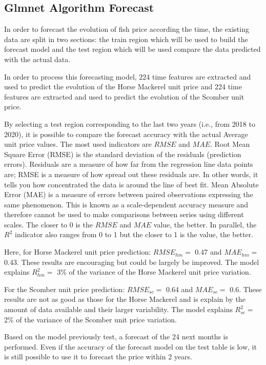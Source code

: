\documentclass[10,a4paperpaper,]{article}
\begin{document}
\subsection{Glmnet Algorithm Forecast}

In order to forecast the evolution of fish price according the time, the
existing data are split in two sections: the train region which will be
used to build the forecast model and the test region which will be used
compare the data predicted with the actual data.

In order to process this forecasting model, 224 time features are
extracted and used to predict the evolution of the Horse Mackerel unit
price and 224 time features are extracted and used to predict the
evolution of the Scomber unit price.

By selecting a test region corresponding to the last two years (i.e.,
from 2018 to 2020), it is possible to compare the forecast accuracy with
the actual Average unit price values. The most used indicators are
\(RMSE\) and \(MAE\). Root Mean Square Error (RMSE) is the standard
deviation of the residuals (prediction errors). Residuals are a measure
of how far from the regression line data points are; RMSE is a measure
of how spread out these residuals are. In other words, it tells you how
concentrated the data is around the line of best fit. Mean Absolute
Error (MAE) is a measure of errors between paired observations
expressing the same phenomenon. This is known as a scale-dependent
accuracy measure and therefore cannot be used to make comparisons
between series using different scales. The closer to 0 is the \(RMSE\)
and \(MAE\) value, the better. In parallel, the \(R^2\) indicator also
ranges from 0 to 1 but the closer to 1 is the value, the better.

Here, for Horse Mackerel unit price prediction: \(RMSE_{hm} =\) 0.47 and
\(MAE_{hm} =\) 0.43. These results are encouraging but could be largely
be improved. The model explains \(R^2_{hm} =\) 3\% of the variance of
the Horse Mackerel unit price variation.

For the Scomber unit price prediction: \(RMSE_{sc} =\) 0.64 and
\(MAE_{sc} =\) 0.6. These results are not as good as those for the Horse
Mackerel and is explain by the amount of data available and their larger
variability. The model explains \(R^2_{sc} =\) 2\% of the variance of
the Scomber unit price variation.

Based on the model previously test, a forecast of the 24 next months is
performed. Even if the accuracy of the forecast model on the test table
is low, it is still possible to use it to forecast the price within 2
years.
\end{document}
